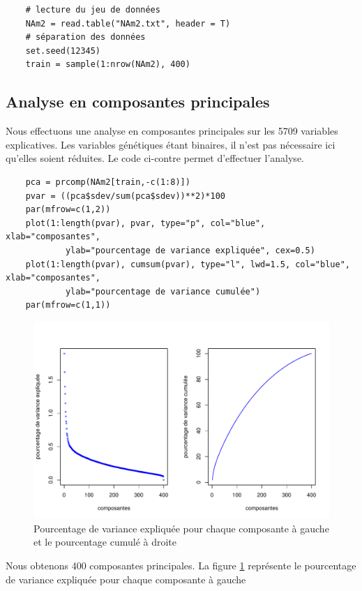 \documentclass[12pt,a4paper]{article}
\begin{document}
\begin{lstlisting}
	# lecture du jeu de données
	NAm2 = read.table("NAm2.txt", header = T)
	# séparation des données
	set.seed(12345)
	train = sample(1:nrow(NAm2), 400)
\end{lstlisting}

\subsection{Analyse en composantes principales}
Nous effectuons une analyse en composantes principales sur les 5709 variables
explicatives. Les variables génétiques étant binaires, il n'est pas nécessaire
ici qu'elles soient réduites. Le code ci-contre permet d'effectuer l'analyse.
\begin{lstlisting}
	pca = prcomp(NAm2[train,-c(1:8)])
	pvar = ((pca$sdev/sum(pca$sdev))**2)*100
	par(mfrow=c(1,2))
	plot(1:length(pvar), pvar, type="p", col="blue", xlab="composantes",
			ylab="pourcentage de variance expliquée", cex=0.5)
	plot(1:length(pvar), cumsum(pvar), type="l", lwd=1.5, col="blue", xlab="composantes",
			ylab="pourcentage de variance cumulée")
	par(mfrow=c(1,1))
\end{lstlisting}
\begin{figure}[h!]
	\begin{center}
		\includegraphics[scale=0.7]{figures/pca_plot.pdf}
		\caption{Pourcentage de variance expliquée pour chaque composante à gauche et le pourcentage cumulé à droite}
		\label{fig:acp_plot}
	\end{center}
\end{figure}
Nous obtenons 400 composantes principales. La figure \ref{fig:acp_plot}
représente le pourcentage de variance expliquée pour chaque composante à gauche
\end{document}
